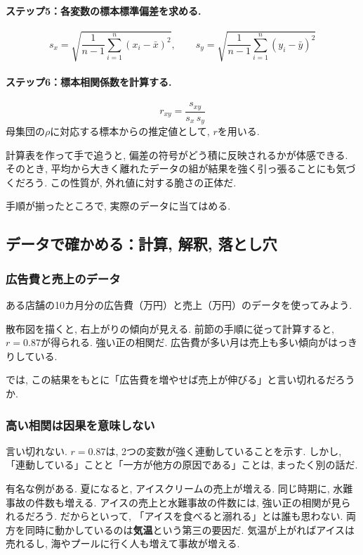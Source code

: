 \paragraph{ステップ5：各変数の標本標準偏差を求める.}
\[
s_x = \sqrt{\frac{1}{n-1} \sum_{i=1}^{n} (x_i - \bar{x})^2}, \qquad s_y = \sqrt{\frac{1}{n-1} \sum_{i=1}^{n} (y_i - \bar{y})^2}
\]

\paragraph{ステップ6：標本相関係数を計算する.}
\[
r_{xy} = \frac{s_{xy}}{s_x \, s_y}
\]
母集団の$\rho$に対応する標本からの推定値として, $r$を用いる.

計算表を作って手で追うと, 偏差の符号がどう積に反映されるかが体感できる.
そのとき, 平均から大きく離れたデータの組が結果を強く引っ張ることにも気づくだろう.
この性質が, 外れ値に対する脆さの正体だ.

手順が揃ったところで, 実際のデータに当てはめる.


\subsection{データで確かめる：計算, 解釈, 落とし穴}

\subsubsection*{広告費と売上のデータ}

ある店舗の10カ月分の広告費（万円）と売上（万円）のデータを使ってみよう.


散布図を描くと, 右上がりの傾向が見える.
前節の手順に従って計算すると, $r = 0.87$が得られる.
強い正の相関だ.
広告費が多い月は売上も多い傾向がはっきりしている.

では, この結果をもとに「広告費を増やせば売上が伸びる」と言い切れるだろうか.

\subsubsection*{高い相関は因果を意味しない}

言い切れない.
$r = 0.87$は, 2つの変数が強く連動していることを示す.
しかし, 「連動している」ことと「一方が他方の原因である」ことは, まったく別の話だ.

有名な例がある.
夏になると, アイスクリームの売上が増える. 同じ時期に, 水難事故の件数も増える.
アイスの売上と水難事故の件数には, 強い正の相関が見られるだろう.
だからといって, 「アイスを食べると溺れる」とは誰も思わない.
両方を同時に動かしているのは\textbf{気温}という第三の要因だ.
気温が上がればアイスは売れるし, 海やプールに行く人も増えて事故が増える.

